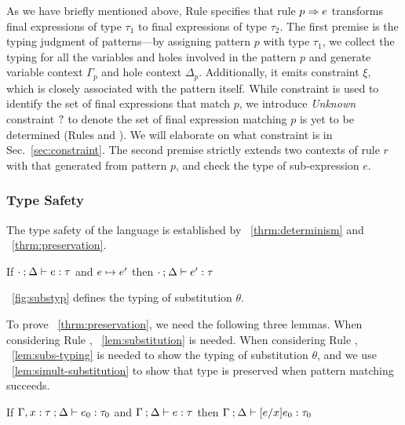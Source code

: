 \documentclass[runningheads,envcountsame,a4paper]{llncs}
\begin{document}
As we have briefly mentioned above, Rule \TRule specifies that rule
$p \Rightarrow e$ transforms final expressions of type $\tau_1$ to final expressions
of type $\tau_2$. The first premise is the typing judgment of patterns---by
assigning pattern $p$ with type $\tau_1$, we collect the typing for all the
variables and holes involved in the pattern $p$ and generate variable context
$\Gamma_p$ and hole context $\Delta_p$. Additionally, it emits constraint $\xi$,
which is closely associated with the pattern itself. While constraint is used to
identify the set of final expressions that match $p$, we introduce
\textit{Unknown} constraint $\mathtt{?}$ to denote the set of final expression
matching $p$ is yet to be determined (Rules \PTEHole and \PTHole). We will elaborate on what constraint is in
Sec.~\ref{sec:constraint}. The second premise strictly extends two contexts of
rule $r$ with that generated from pattern $p$, and check the type of
sub-expression $e$.

\subsubsection{Type Safety}
The type safety of the language is established by
\theoremname~\ref{thrm:determinism} and \theoremname~\ref{thrm:preservation}.

\begin{theorem}[Preservation]
  \label{thrm:preservation}
  If $\cdot \mathbin{;} \Delta \vdash e : \tau$ and $e \mapsto e'$
  then $\cdot \mathbin{;} \Delta \vdash e' : \tau$
\end{theorem}



\figurename~\ref{fig:substyp} defines the typing of substitution $\theta$.

To prove \theoremname~\ref{thrm:preservation}, we need the following three lemmas.
When considering Rule \ITAp, \lemmaname~\ref{lem:substitution} is needed.
When considering Rule \ITSuccMatch, \lemmaname~\ref{lem:subs-typing} is needed
to show the typing of substitution $\theta$, and we use
\lemmaname~\ref{lem:simult-substitution} to show that type is preserved when pattern
matching succeeds.

\begin{lemma}[Substitution]
  \label{lem:substitution}
  If $\Gamma, x : \tau \mathbin{;} \Delta \vdash e_0 : \tau_0$ and $\Gamma \mathbin{;} \Delta \vdash e : \tau$
  then $\Gamma \mathbin{;} \Delta \vdash [e/x]e_0 : \tau_0$
\end{lemma}
\end{document}

